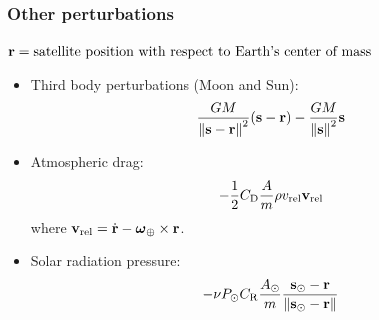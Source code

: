 \documentclass{beamer} %
\begin{document}
\begin{frame}
  \frametitle{Other perturbations}
  $\boldsymbol{\mathrm{r}} = \text{satellite position with respect to Earth's center of mass}$

  \vspace{0.25cm}
  \begin{itemize}
    \item<1-> Third body perturbations (Moon and Sun): $$\frac{GM}{\left\|\boldsymbol{\mathrm{s}}-\boldsymbol{\mathrm{r}}\right\|^2}(\boldsymbol{\mathrm{s}}-\boldsymbol{\mathrm{r}}) - \frac{GM}{\left\|\boldsymbol{\mathrm{s}}\right\|^2}\boldsymbol{\mathrm{s}}$$
    \item<2-> Atmospheric drag: $$-\frac{1}{2}C_\mathrm{D} \frac{A}{m}\rho v_\mathrm{rel}\boldsymbol{\mathrm{v}}_\mathrm{rel}$$
      where $\boldsymbol{\mathrm{v}}_\mathrm{rel}=\dot{\boldsymbol{\mathrm{r}}}-\boldsymbol{\mathrm{\omega}}_\oplus\times\boldsymbol{\mathrm{r}}$.
    \item<3-> Solar radiation pressure: $$
        -\nu P_\odot C_\mathrm{R} \frac{A_\odot}{m} \frac{\boldsymbol{\mathrm{s}}_\odot-\boldsymbol{\mathrm{r}}}{\left\|\boldsymbol{\mathrm{s}}_\odot-\boldsymbol{\mathrm{r}}\right\|}
      $$
  \end{itemize}
\end{frame}
\end{document}

